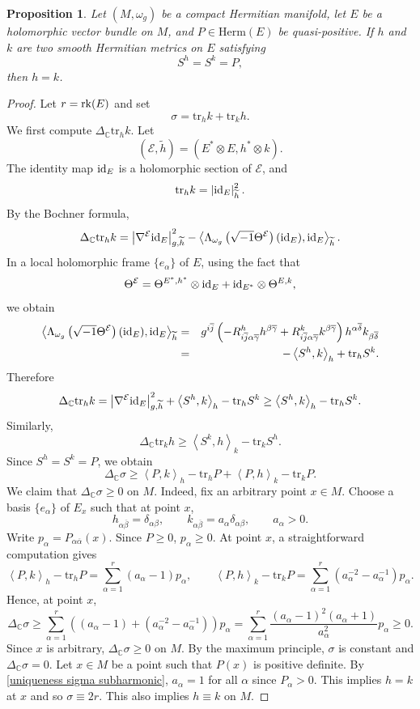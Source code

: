 \documentclass[12pt, reqno]{amsart}
\newcommand\cE{{\mathcal E}}
\newcommand{\id}{{\rm id}}
\newcommand{\rk}{{\rm rk}}
\theoremstyle{plain}
\newtheorem{prop}[thm]{Proposition}
\theoremstyle{definition}
\newcommand{\bproposition}{\begin{prop}}
\newcommand{\eproposition}{\end{prop}}
\newcommand{\bproof}{\begin{proof}}
\newcommand{\eproof}{\end{proof}}
\newcommand{\sq}{\sqrt{-1}}
\renewcommand{\bar}{\overline}
\newcommand{\beq}{\begin{equation}}
\newcommand{\eeq}{\end{equation}}
\renewcommand{\tilde}{\widetilde}
\newcommand{\ts}{\otimes}
\renewcommand{\>}{\rightarrow}
\newcommand{\C}{{\mathbb C}}
\newcommand{\LL}{\left\langle}
\newcommand{\RL}{\right\rangle}
\renewcommand{\>}{\rightarrow}
\renewcommand{\bar}{\overline}
\renewcommand{\tilde}{\widetilde}
\newcommand{\tr}{\mathrm{tr}}
\numberwithin{equation}{section} %
\begin{document}
\bproposition\label{prop uniqueness}
Let $(M,\omega_g)$ be a compact Hermitian manifold, let $E$ be a holomorphic vector bundle on $M$, and  $P\in \mathrm{Herm}(E)$ be quasi-positive. If $h$ and $k$ are two smooth Hermitian metrics on $E$ satisfying
\beq
S^h=S^k=P,
\eeq
then $h=k$.
\eproposition
\bproof
Let $r=\rk(E)$ and set
\beq
\sigma=\tr_h k+\tr_k h.
\eeq
We first compute $\Delta_\C\tr_h k$. Let
\beq
\left(\cE,\tilde h\right)=\left(E^*\ts E,h^*\ts k\right).
\eeq
The identity map $\id_E$ is a holomorphic section of $\cE$, and
\beq
\tr_h k=\left|\id_E\right|_{\tilde h}^2.
\eeq
By the Bochner formula,
\beq
\Delta_\C\tr_h k
= \left|\nabla^{\cE}\id_E\right|_{g,\tilde h}^2
- \LL \Lambda_{\omega_g}\left(\sq \Theta^{\cE}\right)(\id_E),\id_E\RL_{\tilde h}.
\eeq
In a local holomorphic frame $\{e_\alpha\}$ of $E$, using the fact that
\[
\Theta^\cE=\Theta^{E^*,h^*}\ts \id_E+\id_{E^*}\ts \Theta^{E,k},
\]
we obtain
\begin{eqnarray}
\LL \Lambda_{\omega_g}\left(\sq \Theta^{\cE}\right)(\id_E),\id_E\RL_{\tilde h}
&=&g^{i\bar j}\left(-R^h_{i\bar j\alpha\bar\gamma}h^{\beta\bar\gamma}
+R^k_{i\bar j\alpha\bar\gamma}k^{\beta\bar\gamma}\right)
h^{\alpha\bar\delta}k_{\beta\bar\delta}
\nonumber\\
&=&-\LL S^h,k\RL_h+\tr_h S^k.
\end{eqnarray}
Therefore
\beq
\Delta_\C\tr_h k
= \left|\nabla^{\cE}\id_E\right|_{g,\tilde h}^2
+\LL S^h,k\RL_h-\tr_hS^k
\geq \LL S^h,k\RL_h-\tr_hS^k.
\eeq
Similarly,
\beq
\Delta_\C\tr_k h \geq \LL S^k,h\RL_k-\tr_kS^h.
\eeq
Since $S^h=S^k=P$, we obtain
\beq
\Delta_\C\sigma
\geq \LL P,k\RL_h - \tr_hP  + \LL P,h\RL_k - \tr_kP.
\label{uniqueness sigma laplacian}
\eeq
We claim that $\Delta_\C\sigma\geq0$ on $M$. Indeed, fix an arbitrary point
$x\in M$. Choose a basis $\{e_\alpha\}$ of $E_x$ such that at point $x$,
\beq
h_{\alpha\bar\beta}=\delta_{\alpha\beta},\qquad
k_{\alpha\bar\beta}=a_\alpha\delta_{\alpha\beta},\qquad a_\alpha>0.
\eeq
Write $p_\alpha=P_{\alpha\bar\alpha}(x)$. Since $P\geq0$, $p_\alpha\geq0$. At point $x$, a straightforward
computation gives
\beq
\LL P,k\RL_h-\tr_hP
= \sum_{\alpha=1}^r(a_\alpha-1)p_\alpha,\qquad
\LL P,h\RL_k-\tr_kP
= \sum_{\alpha=1}^r(a_\alpha^{-2}-a_\alpha^{-1})p_\alpha.
\eeq
Hence, at point $x$,
\beq
\Delta_\C\sigma
\geq \sum_{\alpha=1}^r \left((a_\alpha-1)+(a_\alpha^{-2}-a_\alpha^{-1})\right)p_\alpha
= \sum_{\alpha=1}^r \frac{(a_\alpha-1)^2(a_\alpha+1)}{a_\alpha^2}p_\alpha
\geq0.
\label{uniqueness sigma subharmonic}
\eeq
Since $x$ is arbitrary, $\Delta_\C\sigma\geq0$ on $M$. By the maximum principle,
$\sigma$ is constant and $\Delta_{\C}\sigma=0$. Let $x\in M$ be a point such that $P(x)$ is positive definite. By \eqref{uniqueness sigma subharmonic},  $a_{\alpha}=1$ for all $\alpha$ since $P_\alpha>0$. This implies $h=k$ at  $x$ and so $\sigma\equiv 2r$. This also implies $h\equiv k$ on $M$.
\eproof
\end{document}
